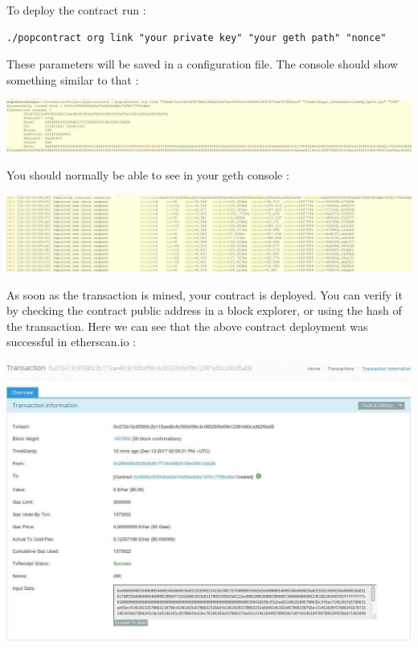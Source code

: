 \documentclass[11pt, a4paper, twoside, openright]{book} %
\begin{document}
To deploy the contract run : 
\begin{lstlisting}
./popcontract org link "your private key" "your geth path" "nonce"
\end{lstlisting}
These parameters will be saved in a configuration file.
The console should show something similar to that : 
\begin{center}
\includegraphics[scale=0.45]{orglink.jpg}
\end{center}
You should normally be able to see in your geth console : 
\begin{center}
\includegraphics[scale=0.45]{gethconsole.jpg}
\end{center}

As soon as the transaction is mined, your contract is deployed. You can verify it by checking the contract public address in a block explorer, or using the hash of the transaction. Here we can see that the above contract deployment was successful in etherscan.io :
\begin{center}
\includegraphics[scale=0.5]{blockexplorer.jpg}
\end{center} 
\end{document}
